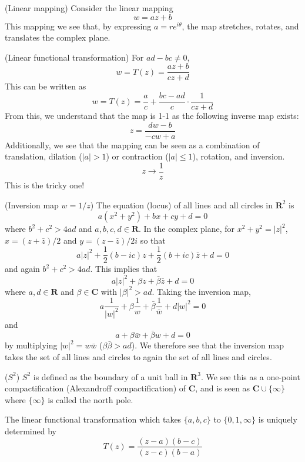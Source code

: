 \vspace{2ex}
\begin{ex}
(Linear mapping) Consider the linear mapping
\[w=az+b\]
This mapping we see that, by expressing $a=re^{i\theta }$, the map stretches, rotates, and translates the complex plane.
\end{ex}
\vspace{2ex}
\begin{defi}
(Linear functional transformation) For $ad-bc\ne 0$,
\[w=T(z)=\dfrac{az+b}{cz+d}\]
This can be written as
\[w=T(z)=\dfrac{a}{c}+\dfrac{bc-ad}{c}\cdot \dfrac{1}{cz+d}\]
From this, we understand that the map is 1-1 as the following inverse map exists:
\[z=\dfrac{dw-b}{-cw+a}\]
Additionally, we see that the mapping can be seen as a combination of translation, dilation ($|a|>1$) or contraction ($|a|\leq 1$), rotation, and inversion. 
\[z\rightarrow \dfrac{1}{z}\]
This is the tricky one! 
\end{defi}
\vspace{2ex}
\begin{rmk}
(Inversion map $w=1/z$) The equation (locus) of all lines and all circles in ${\bm R}^2$ is
\[a(x^2+y^2)+bx+cy+d=0\]
where $b^2+c^2>4ad $ and $a,b,c,d\in {\bm R}$. In the complex plane, for $x^2+y^2=|z|^2$, $x=(z+\bar{z})/2$ and $y=(z-\bar{z})/2i$ so that
\[a|z|^2+\dfrac{1}{2}(b-ic)z+\dfrac{1}{2}(b+ic)\bar{z}+d=0\]
and again $b^2+c^2>4ad$. This implies that
\[a|z|^2+\beta z+\bar{\beta }\bar{z}+d=0\]
where $a,d\in {\bm R}$ and $\beta \in {\bm C}$ with $|\beta |^2>ad$. Taking the inversion map,
\[a\dfrac{1}{|w|^2}+\beta\dfrac{1}{w}+\bar{\beta }\dfrac{1}{\bar{w}}+d|w|^2=0\]
and
\[a+\beta \bar{w}+\bar{\beta }w+d=0\]
by multiplying $|w|^2=w\bar{w}$ ($\beta \bar{\beta }>ad$). We therefore see that the inversion map takes the set of all lines and circles to again the set of all lines and circles.
\end{rmk}
\vspace{2ex}
\begin{defi}
($S^2$) $S^2$ is defined as the boundary of a unit ball in ${\bm R}^3$. We see this as a one-point compactification (Alexandroff compactification) of ${\bm C}$, and is seen as ${\bm C}\cup  \{\infty \}$ where $\{\infty \}$ is called the north pole. 
\end{defi}
\vspace{2ex}
\begin{lem}
The linear functional transformation which takes $\{a,b,c\}$ to $\{0,1,\infty \}$ is uniquely determined by
\[T(z)=\dfrac{(z-a)(b-c)}{(z-c)(b-a)}\]
\end{lem}
\vspace{2ex}

